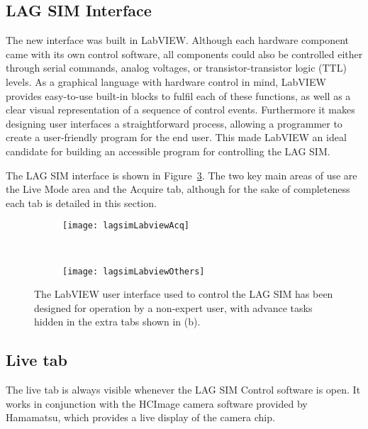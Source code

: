 \subsection{LAG SIM Interface}
The new interface was built in LabVIEW. 
Although each hardware component came with its own control software, all components could also be controlled either through serial commands, analog voltages, or transistor-transistor logic (TTL) levels. 
As a graphical language with hardware control in mind, LabVIEW provides easy-to-use built-in blocks to fulfil each of these functions, as well as a clear visual representation of a sequence of control events.
Furthermore it makes designing user interfaces a straightforward process, allowing a programmer to create a user-friendly program for the end user. 
This made LabVIEW an ideal candidate for building an accessible program for controlling the LAG SIM.

The LAG SIM interface is shown in Figure~\ref{fig:lagsimLabview}.
The two key main areas of use are the Live Mode area and the Acquire tab, although for the sake of completeness each tab is detailed in this section. 

\begin{figure}[p]
\centering
\begin{subfigure}[b]{0.6\textwidth}
	\texttt{[image: lagsimLabviewAcq]}
	\caption{}\label{fig:fpbLabviewAcq}
\end{subfigure}

~\newline
\begin{subfigure}[b]{1.0\textwidth}
	\texttt{[image: lagsimLabviewOthers]}
	\caption{}\label{fig:fpbLabviewTabs}
\end{subfigure}
\caption[LAG SIM: The LabVIEW user interface for controlling LAG SIM is designed for operation by non-expert users]{The LabVIEW user interface used to control the LAG SIM has been designed for operation by a non-expert user, with advance tasks hidden in the extra tabs shown in (b). } %
\label{fig:lagsimLabview}
\end{figure}

\subsection{Live tab} \label{sec:lagsimLive}
The live tab is always visible whenever the LAG SIM Control software is open. 
It works in conjunction with the HCImage camera software provided by Hamamatsu, which provides a live display of the camera chip. 

